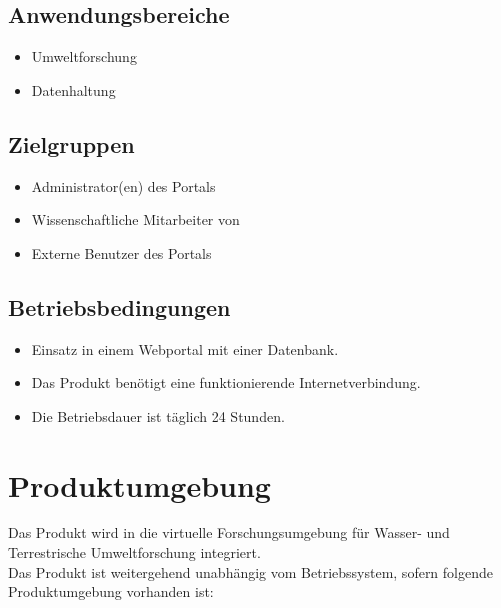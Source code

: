 \documentclass[parskip=full,11pt]{scrartcl}
\begin{document}
\subsection{Anwendungsbereiche}
\begin{itemize}[itemsep=0pt]
\item Umweltforschung
\item Datenhaltung
\end{itemize}

\subsection{Zielgruppen}
\begin{itemize}[itemsep=0pt]
\item Administrator(en) des Portals %
\item Wissenschaftliche Mitarbeiter von \grqq
\item Externe Benutzer des Portals
\end{itemize}
\newpage
\subsection{Betriebsbedingungen}
\begin{itemize}[itemsep=0pt]
\item Einsatz in einem Webportal mit einer \gls{Datenbank}.
\item Das Produkt benötigt eine funktionierende Internetverbindung.
\item Die Betriebsdauer ist täglich 24 Stunden.
\end{itemize}


\section{Produktumgebung}
Das Produkt wird in die virtuelle Forschungsumgebung für Wasser- und Terrestrische Umweltforschung \grqq integriert.\\
Das Produkt ist weitergehend unabhängig vom Betriebssystem, sofern folgende Produktumgebung vorhanden ist:
\end{document}
